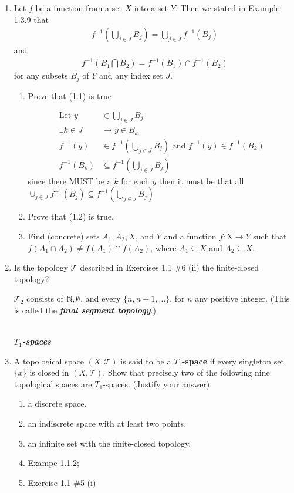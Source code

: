 \documentclass[10pt,a4paper]{report}
\newcommand{\SPECIAL}[1]{\begin{center}
	{\Large \textbf{\textit{\\#1}} }
\end{center}
}
\newcommand{\TT}{\mathcal{T}}
\begin{document}
\begin{enumerate}
	\item Let $f$ be a function from a set $X$ into a set $Y$.  Then we stated in Example 1.3.9 that
\begin{align}
	f^{-1}\left(\bigcup_{j\in J}B_j \right) = \bigcup_{j\in J}f^{-1}(B_j)
\end{align} and 
\begin{align}
	f^{-1}\left( B_1 \bigcap B_2\right) = f^{-1}(B_1)\cap f^{-1}(B_2)
\end{align} 
for any subsets $B_j$ of $Y$ and any index set $J$.
\begin{enumerate}
	\item Prove that (1.1) is true
	
	\begin{align*}
		\text{Let } y &\in \bigcup_{j \in J} B_j\\
		\exists k \in J &\to y \in B_k \\
		f^{-1}(y) &\in f^{-1}\left(\bigcup_{j\in J} B_j\right) \text{ and } f^{-1}(y) \in f^{-1}(B_k) \\
		f^{-1}(B_k) & \subseteq f^{-1}\left(\bigcup_{j\in J} B_j\right)
	\end{align*}since there MUST be a $k$ for each $y$ then it must be that all $\cup_{j\in J}f^{-1}(B_j) \subseteq f^{-1}\left(\bigcup_{j\in J} B_j\right)$
	
	\item Prove that (1.2) is true.
	\item Find (concrete) sets $A_1,A_2, X$, and $Y$ and a function $f: $X$ \to Y$ such that $f(A_1\cap A_2)\ne f(A_1)\cap f(A_2)$, where $A_1 \subseteq X$ and $A_2 \subseteq X$.
\end{enumerate}

\item Is the topology $\TT$ described in Exercises 1.1 \#6 (ii) the finite-closed topology?

$\TT_2$ consists of $\mathbb{N},\emptyset$, and every $\{n, n+1, \dots\}$, for $n$ any positive integer. (This is called the \textbf{\textit{final segment topology}}.)

\SPECIAL{$T_1$-spaces}

\item A topological space $(X, \TT)$ is said to be a \textbf{$T_1$-space} if every singleton set $\{x\}$ is closed in $(X,\TT)$.  Show that precisely two of the following nine topological spaces are $T_1$-spaces. (Justify your answer).
\begin{enumerate}[label=(\roman*)]
	\item a discrete space.
	\item an indiscrete space with at least two points.
	\item an infinite set with the finite-closed topology.
	\item Exampe 1.1.2;
	\item Exercise 1.1 \#5 (i)
	

\end{enumerate}
\end{enumerate}
\end{document}
